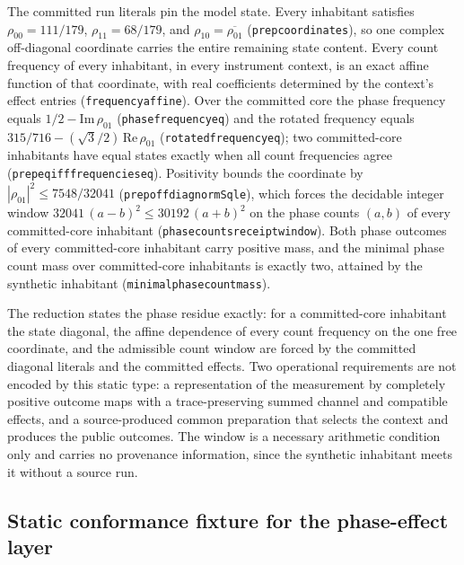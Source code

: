 \documentclass[11pt]{article}
\renewcommand{\_}{\textunderscore\allowbreak}
\theoremstyle{remark}
\begin{document}
The committed run literals pin the model state. Every inhabitant satisfies
$\rho_{00} = 111/179$, $\rho_{11} = 68/179$, and
$\rho_{10} = \overline{\rho_{01}}$ (\texttt{prep\_coordinates}), so one
complex off-diagonal coordinate carries the entire remaining state content.
Every count frequency of every inhabitant, in every instrument context, is an
exact affine function of that coordinate, with real coefficients determined
by the context's effect entries (\texttt{frequency\_affine}). Over the
committed core the phase frequency equals
$1/2 - \mathrm{Im}\,\rho_{01}$ (\texttt{phase\_frequency\_eq}) and the rotated
frequency equals $315/716 - (\sqrt{3}/2)\,\mathrm{Re}\,\rho_{01}$
(\texttt{rotated\_frequency\_eq}); two committed-core inhabitants have equal
states exactly when all count frequencies agree
(\texttt{prep\_eq\_iff\_frequencies\_eq}). Positivity bounds the coordinate by
$|\rho_{01}|^2 \le 7548/32041$ (\texttt{prep\_offdiag\_normSq\_le}), which
forces the decidable integer window
$32041\,(a-b)^2 \le 30192\,(a+b)^2$ on the phase counts $(a,b)$ of every
committed-core inhabitant (\texttt{phase\_counts\_receipt\_window}). Both
phase outcomes of every committed-core inhabitant carry positive mass, and
the minimal phase count mass over committed-core inhabitants is exactly two,
attained by the synthetic inhabitant
(\texttt{minimal\_phase\_count\_mass}).

The reduction states the phase residue exactly: for a committed-core
inhabitant the state diagonal, the affine dependence of every count frequency
on the one free coordinate, and the admissible count window are forced by the
committed diagonal literals and the committed effects. Two operational requirements are not encoded by this static type: a
representation of the measurement by completely positive outcome maps with a
trace-preserving summed channel and compatible effects, and a source-produced
common preparation that selects the context and produces the public outcomes. The window is a
necessary arithmetic condition only and carries no provenance information,
since the synthetic inhabitant meets it without a source run.

\subsection{Static conformance fixture for the phase-effect layer}
\label{sec:phase-attainment}
\end{document}
